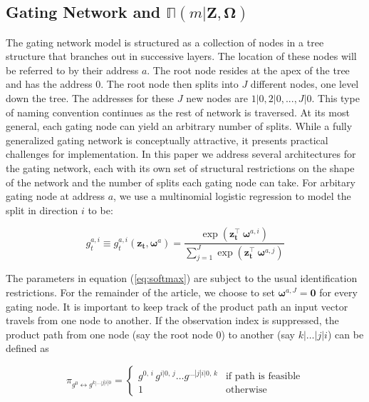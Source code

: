 \documentclass[12pt]{article}
\newcommand{\gateprod}[2]{\pi_{#1 \longleftrightarrow #2}}
\newcommand{\expmixwt}[0]{\mathbb{\Pi}}
\begin{document}
\subsection{Gating Network and $\expmixwt(m | \boldsymbol{Z}, \boldsymbol{\Omega})$} \label{subsec:GatingNetwork}

The gating network model is structured as a collection of nodes in a tree
structure that branches out in successive layers. The location of these nodes will
be referred to by their address $a$. The root node resides at the apex of the tree
and has the address $0$. The root node then splits into $J$ different nodes,
one level down the tree. The addresses for these $J$ new nodes are 
$1|0, 2|0, ..., J|0$. This type of naming convention continues as the
rest of network is traversed. At its most general, each gating node can yield an
arbitrary number of splits. While a fully generalized gating network is
conceptually attractive, it presents practical challenges for implementation.
In this paper we address several architectures for the gating network, each
with its own set of structural restrictions on the shape of the network and
the number of splits each gating node can take. For arbitary gating node at address $a$,
we use a multinomial logistic regression to model the split in direction $i$ to be:

\begin{equation} \label{eq:softmax}
  g^{a,i}_{t} \equiv g^{a,i}_{t}(\boldsymbol{z_{t}}, \boldsymbol{\omega}^{a}) = \frac{\exp(\boldsymbol{z^{\top}_{t}} \ \boldsymbol{\omega}^{a,i})}{\sum^{J}_{j=1} {\exp(\boldsymbol{z^{\top}_{t}} \ \boldsymbol{\omega}^{a,j})}}
\end{equation}

The parameters in equation (\ref{eq:softmax}) are subject to the usual
identification restrictions. For the remainder of the article, we choose
to set $\boldsymbol{\omega}^{a,J} = \boldsymbol{0}$ for every gating node.
It is important to keep track of the product path an input vector travels from
one node to another. If the observation index is suppressed, the product path
from one node (say the root node $0$) to another (say $k|\ldots|j|i$)
can be defined as

\begin{equation} \label{eq:gpath}
  \gateprod{g^{0}}{g^{k|\ldots|j|i|0}} =
    \begin{cases} 
       g^{0, \, i} \, g^{i|0, \, j} \ldots g^{\dots|j|i|0, \, k} & \textrm{if path is feasible} \\
       1 & \textrm{otherwise}
    \end{cases}
\end{equation}
\end{document}
